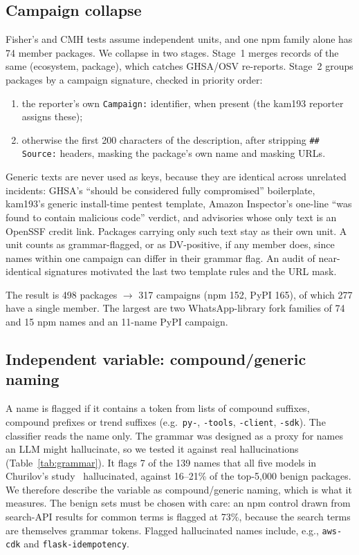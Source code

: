 \documentclass[10pt,conference]{IEEEtran}
\begin{document}
\subsection{Campaign collapse}
\label{sec:collapse}
Fisher's and CMH tests assume independent units, and one npm family alone
has 74 member packages. We collapse in two stages. Stage~1 merges records
of the same (ecosystem, package), which catches GHSA/OSV re-reports.
Stage~2 groups packages by a campaign signature, checked in priority order:
\begin{enumerate}
\item the reporter's own \texttt{Campaign:} identifier, when present (the
kam193 reporter assigns these);
\item otherwise the first 200 characters of the description, after
stripping \texttt{\#\# Source:} headers, masking the package's own name and
masking URLs.
\end{enumerate}
Generic texts are never used as keys, because they are identical across
unrelated incidents: GHSA's ``should be considered fully compromised''
boilerplate, kam193's generic install-time pentest template, Amazon
Inspector's one-line ``was found to contain malicious code'' verdict, and
advisories whose only text is an OpenSSF credit link. Packages carrying
only such text stay as their own unit. A unit counts as grammar-flagged, or
as DV-positive, if any member does, since names within one campaign can
differ in their grammar flag. An audit of near-identical signatures
motivated the last two template rules and the URL mask.

The result is 498 packages $\rightarrow$ 317 campaigns (npm 152, PyPI 165),
of which 277 have a single member. The largest are two WhatsApp-library
fork families of 74 and 15 npm names and an 11-name PyPI campaign.

\subsection{Independent variable: compound/generic naming}
\label{sec:iv}
A name is flagged if it contains a token from lists of compound suffixes,
compound prefixes or trend suffixes (e.g.\ \texttt{py-}, \texttt{-tools},
\texttt{-client}, \texttt{-sdk}). The classifier reads the name only. The
grammar was designed as a proxy for names an LLM might hallucinate, so we
tested it against real hallucinations (Table~\ref{tab:grammar}). It flags
7 of the 139 names that all five models in Churilov's
study~\cite{churilov2026} hallucinated, against 16--21\% of the top-5,000
benign packages. We therefore describe the variable as compound/generic
naming, which is what it measures. The benign sets must be chosen with
care: an npm control drawn from search-API results for common terms is
flagged at 73\%, because the search terms are themselves grammar tokens.
Flagged hallucinated names include, e.g., \texttt{aws-cdk} and
\texttt{flask-idempotency}.
\end{document}

